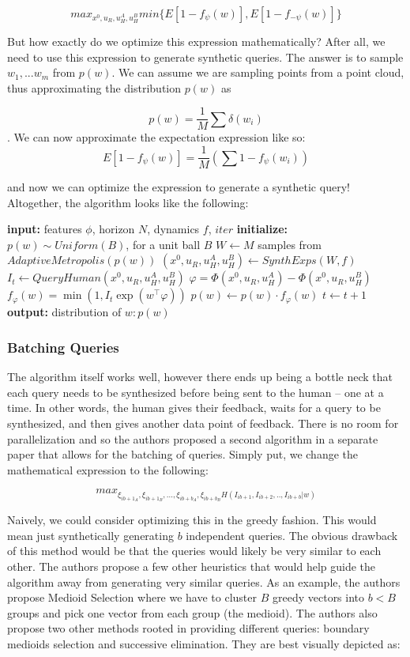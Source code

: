 \documentclass[
  letterpaper,
  numbers=noenddot,
  DIV=11,
  oneside]{scrreprt}
\theoremstyle{remark}
\begin{document}
\[max_{x^0, u_R, u_H^A, u_H^B} min\{E[1-f_{\psi}(w)], E[1 - f_{-\psi}(w)]\}\]

But how exactly do we optimize this expression mathematically? After
all, we need to use this expression to generate synthetic queries. The
answer is to sample \(w_1, ... w_m\) from \(p(w)\). We can assume we are
sampling points from a point cloud, thus approximating the distribution
\(p(w)\) as

\[p(w) = \frac{1}{M} \sum \delta (w_i)\]. We can now approximate the
expectation expression like so:
\[E[1 - f_{\psi}(w)] = \frac{1}{M} (\sum 1 - f_{\psi}(w_i))\]

and now we can optimize the expression to generate a synthetic query!
Altogether, the algorithm looks like the following:

\textbf{input:} features \(\phi\), horizon \(N\), dynamics \(f\),
\(iter\) \textbf{initialize:} \(p(w) \sim Uniform(B)\), for a unit ball
\(B\) \(W \gets M\) samples from \(AdaptiveMetropolis(p(w))\)
\((x^0, u_R, u^A_H, u^B_H) \gets SynthExps(W,f)\)
\(I_t \gets QueryHuman(x^0, u_R, u^A_H, u^B_H)\)
\(\varphi = \Phi(x^0, u_R, u^A_H) - \Phi(x^0, u_R, u^B_H)\)
\(f_\varphi(w) = \min(1, I_t\exp(w^\top \varphi))\)
\(p(w) \gets p(w) \cdot f_\varphi(w)\) \(t \gets t+1\) \textbf{output:}
distribution of \(w: p(w)\)

\subsubsection{Batching Queries}\label{batching-queries}

The algorithm itself works well, however there ends up being a bottle
neck that each query needs to be synthesized before being sent to the
human -- one at a time. In other words, the human gives their feedback,
waits for a query to be synthesized, and then gives another data point
of feedback. There is no room for parallelization and so the authors
proposed a second algorithm in a separate paper that allows for the
batching of queries. Simply put, we change the mathematical expression
to the following:

\[max_{\xi_{ib+1_A}, \xi_{ib+1_B}, ... , \xi_{ib+b_A}, \xi_{ib+b_B} H(I_{ib+1}, I_{ib+2}, .., I_{ib+b} | w)}\]

Naively, we could consider optimizing this in the greedy fashion. This
would mean just synthetically generating \(b\) independent queries. The
obvious drawback of this method would be that the queries would likely
be very similar to each other. The authors propose a few other
heuristics that would help guide the algorithm away from generating very
similar queries. As an example, the authors propose Medioid Selection
where we have to cluster \(B\) greedy vectors into \(b < B\) groups and
pick one vector from each group (the medioid). The authors also propose
two other methods rooted in providing different queries: boundary
medioids selection and successive elimination. They are best visually
depicted as:
\end{document}
